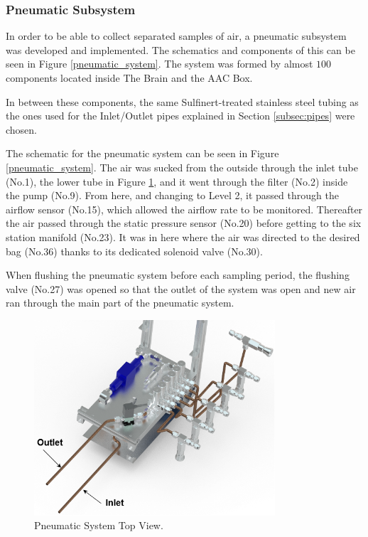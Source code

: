 \pagebreak
\subsubsection{Pneumatic Subsystem}
\label{sec:4.4.5}

In order to be able to collect separated samples of air, a pneumatic subsystem was developed and implemented. The schematics and components of this can be seen in Figure \ref{pneumatic_system}. The system was formed by almost $100$ components located inside The Brain and the AAC Box. 

In between these components, the same Sulfinert-treated stainless steel tubing as the ones used for the Inlet/Outlet pipes explained in Section \ref{subsec:pipes} were chosen. 

The schematic for the pneumatic system can be seen in Figure \ref{pneumatic_system}. The air was sucked from the outside through the inlet tube (No.1), the lower tube in Figure \ref{pneumatic_system_cad}, and it went through the filter (No.2) inside the pump (No.9). From here, and changing to Level 2, it passed through the airflow sensor (No.15), which allowed the airflow rate to be monitored. Thereafter the air passed through the static pressure sensor (No.20) before getting to the six station manifold (No.23). It was in here where the air was directed to the desired bag (No.36) thanks to its dedicated solenoid valve (No.30).

When flushing the pneumatic system before each sampling period, the flushing valve (No.27) was opened so that the outlet of the system was open and new air ran through the main part of the pneumatic system. 


\begin{figure}[H]
    \centering
   \includegraphics[width=0.8\textwidth]{4-experiment-design/img/Mechanical/Figure_26.png}
   \caption{Pneumatic System Top View.}
    \label{pneumatic_system_cad}
\end{figure}


